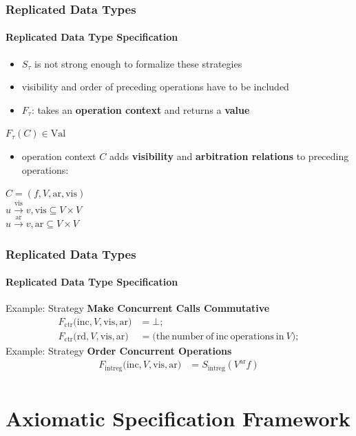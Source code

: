 \documentclass[11pt]{beamer}
\begin{document}
\begin{frame}
\frametitle{Replicated Data Types}
\framesubtitle{Replicated Data Type Specification}
\begin{itemize}
\item \(S_{\tau}\) is not strong enough to formalize these strategies
\item visibility and order of preceding operations have to be included
\pause
\item \(F_\tau\): takes an \textbf{operation context} and returns a \textbf{value}
\end{itemize}

\begin{center}
\(F_\tau(C) \in \mathrm{Val}\) \\
\end{center}
\pause
\begin{itemize}
\item operation context \(C\) adds \textbf{visibility} and \textbf{arbitration relations} to preceding operations:
\end{itemize}

\begin{center}
\(C = (f, V, \mathrm{ar}, \mathrm{vis})\) \\
\pause
\(u \xrightarrow{\mathrm{vis}} v, \mathrm{vis} \subseteq V \times V  \) \\
\pause
\(u \xrightarrow{\mathrm{ar}} v, \mathrm{ar} \subseteq V \times V  \)
\end{center}

\end{frame}


\begin{frame}
\frametitle{Replicated Data Types}
\framesubtitle{Replicated Data Type Specification}
Example: Strategy \textbf{Make Concurrent Calls Commutative}
\begin{align*}
F_{\mathrm{ctr}} \mathrm{(inc}, V, \mathrm{vis, ar)} &= \bot; \\
F_{\mathrm{ctr}} \mathrm{(rd}, V, \mathrm{vis, ar)} &= \mathrm{(the\ number\ of\ inc\ operations\ in\ } V);
\end{align*}
\pause
Example: Strategy \textbf{Order Concurrent Operations}
\begin{align*}
F_{\mathrm{intreg}} \mathrm{(inc}, V, \mathrm{vis, ar)} &= S_{\mathrm{intreg}}(V^{\mathrm{ar}} f) \\
\end{align*}
\end{frame}

\section{Axiomatic Specification Framework}
\end{document}
